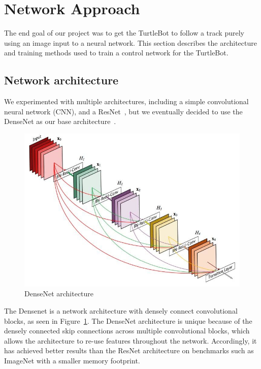 \section{Network Approach}
\label{sec:network}
The end goal of our project was to get the TurtleBot to follow a track purely using an image input to a neural network.
This section describes the architecture and training methods used to train a control network for the TurtleBot.

\subsection{Network architecture}
We experimented with multiple architectures, including a simple convolutional neural network (CNN), and a ResNet~\cite{ResNet}, but we eventually decided to use the DenseNet as our base architecture~\cite{DenseNet}.

\begin{figure}[hbt]
  \includegraphics[width=\columnwidth]{figures/densenet}
  \caption{DenseNet architecture}
  \label{fig:densenet}
\end{figure}

The Densenet is a network architecture with densely connect convolutional
blocks, as seen in Figure~\ref{fig:densenet}. The DenseNet architecture is
unique because of the densely connected skip connections across multiple
convolutional blocks, which allows the architecture to re-use features
throughout the network. Accordingly, it has achieved better results than the
ResNet architecture on benchmarks such as ImageNet with a smaller memory footprint.

